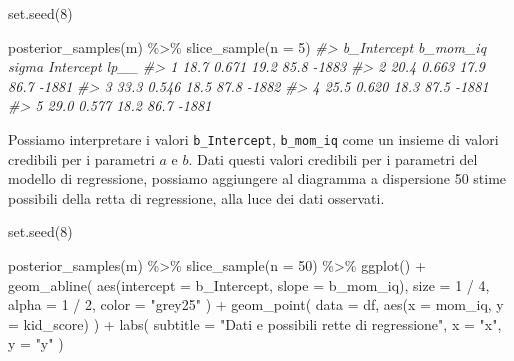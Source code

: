 \documentclass[
  10pt,
  italian,
  a4paper,
  extrafontsizes,onecolumn,openright
  ]{memoir}
\newenvironment{Shaded}{\begin{snugshade}}{\end{snugshade}}
\newcommand{\AttributeTok}[1]{\textcolor[rgb]{0.77,0.63,0.00}{#1}}
\newcommand{\CommentTok}[1]{\textcolor[rgb]{0.56,0.35,0.01}{\textit{#1}}}
\newcommand{\DecValTok}[1]{\textcolor[rgb]{0.00,0.00,0.81}{#1}}
\newcommand{\FunctionTok}[1]{\textcolor[rgb]{0.00,0.00,0.00}{#1}}
\newcommand{\NormalTok}[1]{#1}
\newcommand{\SpecialCharTok}[1]{\textcolor[rgb]{0.00,0.00,0.00}{#1}}
\newcommand{\StringTok}[1]{\textcolor[rgb]{0.31,0.60,0.02}{#1}}
\begin{document}
\begin{Shaded}
\begin{Highlighting}[]
\FunctionTok{set.seed}\NormalTok{(}\DecValTok{8}\NormalTok{)}

\FunctionTok{posterior\_samples}\NormalTok{(m) }\SpecialCharTok{\%\textgreater{}\%}
  \FunctionTok{slice\_sample}\NormalTok{(}\AttributeTok{n =} \DecValTok{5}\NormalTok{)}
\CommentTok{\#\textgreater{}   b\_Intercept b\_mom\_iq sigma Intercept  lp\_\_}
\CommentTok{\#\textgreater{} 1        18.7    0.671  19.2      85.8 {-}1883}
\CommentTok{\#\textgreater{} 2        20.4    0.663  17.9      86.7 {-}1881}
\CommentTok{\#\textgreater{} 3        33.3    0.546  18.5      87.8 {-}1882}
\CommentTok{\#\textgreater{} 4        25.5    0.620  18.3      87.5 {-}1881}
\CommentTok{\#\textgreater{} 5        29.0    0.577  18.2      86.7 {-}1881}
\end{Highlighting}
\end{Shaded}

Possiamo interpretare i valori \texttt{b\_Intercept}, \texttt{b\_mom\_iq} come un insieme di valori credibili per i parametri \(a\) e \(b\). Dati questi valori credibili per i parametri del modello di regressione, possiamo aggiungere al diagramma a dispersione 50 stime possibili della retta di regressione, alla luce dei dati osservati.

\begin{Shaded}
\begin{Highlighting}[]
\FunctionTok{set.seed}\NormalTok{(}\DecValTok{8}\NormalTok{)}

\FunctionTok{posterior\_samples}\NormalTok{(m) }\SpecialCharTok{\%\textgreater{}\%}
  \FunctionTok{slice\_sample}\NormalTok{(}\AttributeTok{n =} \DecValTok{50}\NormalTok{) }\SpecialCharTok{\%\textgreater{}\%}
  \FunctionTok{ggplot}\NormalTok{() }\SpecialCharTok{+}
  \FunctionTok{geom\_abline}\NormalTok{(}
    \FunctionTok{aes}\NormalTok{(}\AttributeTok{intercept =}\NormalTok{ b\_Intercept, }\AttributeTok{slope =}\NormalTok{ b\_mom\_iq),}
    \AttributeTok{size =} \DecValTok{1} \SpecialCharTok{/} \DecValTok{4}\NormalTok{, }\AttributeTok{alpha =} \DecValTok{1} \SpecialCharTok{/} \DecValTok{2}\NormalTok{, }\AttributeTok{color =} \StringTok{"grey25"}
\NormalTok{  ) }\SpecialCharTok{+}
  \FunctionTok{geom\_point}\NormalTok{(}
    \AttributeTok{data =}\NormalTok{ df,}
    \FunctionTok{aes}\NormalTok{(}\AttributeTok{x =}\NormalTok{ mom\_iq, }\AttributeTok{y =}\NormalTok{ kid\_score)}
\NormalTok{  ) }\SpecialCharTok{+}
  \FunctionTok{labs}\NormalTok{(}
    \AttributeTok{subtitle =} \StringTok{"Dati e possibili rette di regressione"}\NormalTok{,}
    \AttributeTok{x =} \StringTok{"x"}\NormalTok{,}
    \AttributeTok{y =} \StringTok{"y"}
\NormalTok{  )}
\end{Highlighting}
\end{Shaded}
\end{document}
